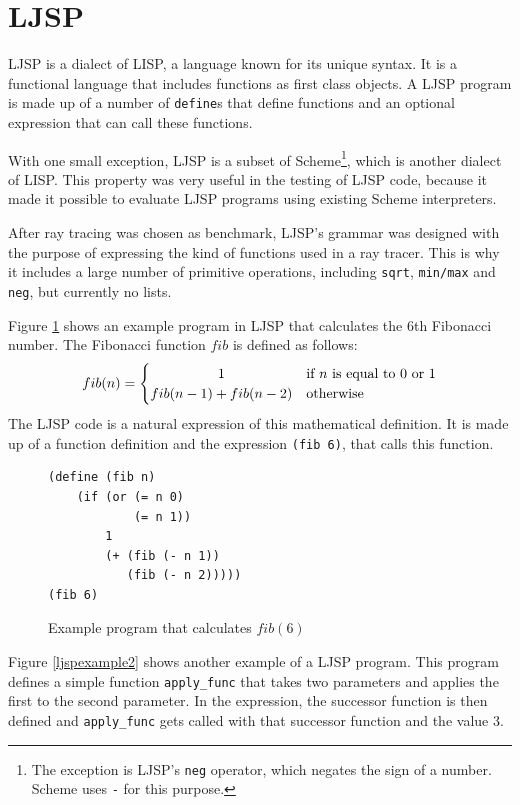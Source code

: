 \documentclass[11pt]{report}
\begin{document}
\section{LJSP}

LJSP is a dialect of LISP, a language known for its unique syntax. It is a functional language that includes functions as first class objects. A LJSP program is made up of a number of \texttt{define}s that define functions and an optional expression that can call these functions.

With one small exception, LJSP is a subset of Scheme\footnote{The exception is LJSP's \texttt{neg} operator, which negates the sign of a number. Scheme uses \texttt{-} for this purpose.}, which is another dialect of LISP. This property was very useful in the testing of LJSP code, because it made it possible to evaluate LJSP programs using existing Scheme interpreters.

After ray tracing was chosen as benchmark, LJSP's grammar was designed with the purpose of expressing the kind of functions used in a ray tracer. This is why it includes a large number of primitive operations, including \texttt{sqrt}, \texttt{min/max} and \texttt{neg}, but currently no lists.

Figure \ref{ljspexample} shows an example program in LJSP that calculates the 6th Fibonacci number. The Fibonacci function $fib$ is defined as follows:
\[
 fib(n) =
  \begin{cases} 
      \hfill 1                   \hfill & \text{if $n$ is equal to $0$ or $1$} \\
      \hfill fib(n-1) + fib(n-2) \hfill & \text{otherwise} \\
  \end{cases}
\]
The LJSP code is a natural expression of this mathematical definition. It is made up of a function definition and the expression \texttt{(fib 6)}, that calls this function.
\begin{figure}[ht]
\begin{lstlisting}
(define (fib n) 
    (if (or (= n 0) 
            (= n 1)) 
        1 
        (+ (fib (- n 1)) 
           (fib (- n 2)))))
(fib 6)
\end{lstlisting}
\caption{Example program that calculates $fib(6)$}
\label{ljspexample}
\end{figure}



Figure \ref{ljspexample2} shows another example of a LJSP program. This program defines a simple function \texttt{apply_func} that takes two parameters and applies the first to the second parameter. In the expression, the successor function is then defined and \texttt{apply_func} gets called with that successor function and the value $3$.
\end{document}
